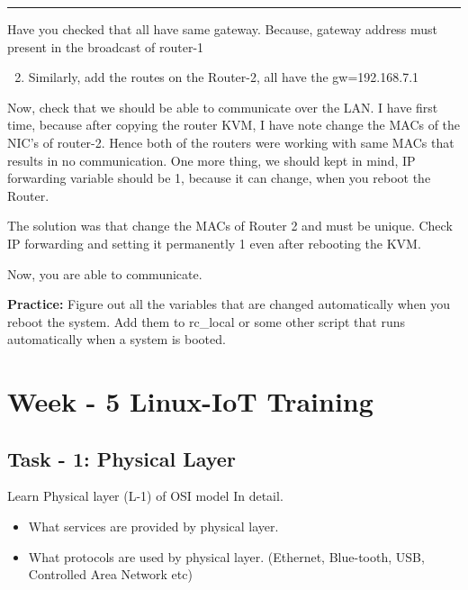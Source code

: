 \documentclass[letterpaper,10pt,english]{sphinxmanual}
\begin{document}
\bigskip\hrule{}\bigskip


Have you checked that all have same gateway. Because, gateway address must present in the broadcast of router-1
\begin{enumerate}
\setcounter{enumi}{1}
\item {} 
Similarly, add the routes on the Router-2, all have the gw=192.168.7.1

\end{enumerate}

Now, check that we should be able to communicate over the LAN. I have first time, because after copying the router KVM, I have note change the MACs of the NIC's of router-2. Hence both of the routers were working with same MACs that results in no communication. One more thing, we should kept in mind, IP forwarding variable should be 1, because it can change, when you reboot the Router.

The solution was that change the MACs of Router 2 and must be unique. Check IP forwarding and setting it permanently 1 even after rebooting the KVM.



Now, you are able to communicate.

\textbf{Practice:} Figure out all the variables that are changed automatically when you reboot the system. Add them to rc\_local or some other script that runs automatically when a system is booted.


\chapter{Week - 5 Linux-IoT Training}
\label{week-05:week-5-linux-iot-training}\label{week-05:week-05}\label{week-05::doc}

\section{Task - 1: Physical Layer}
\label{week-05:task-1-physical-layer}
Learn Physical layer (L-1) of OSI model In detail.
\begin{itemize}
\item {} 
What services are provided by physical layer.

\item {} 
What protocols are used by physical layer. (Ethernet, Blue-tooth, USB, Controlled Area Network etc)

\end{itemize}
\end{document}
